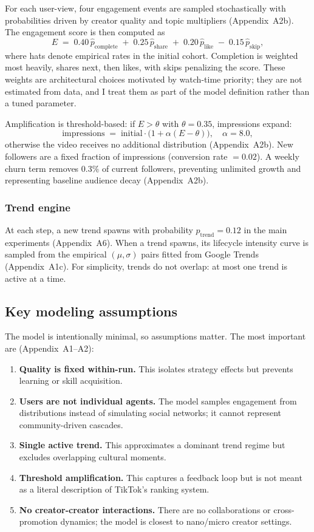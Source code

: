 \documentclass[10pt]{article}
\newcommand{\appref}[1]{(Appendix~#1)}
\begin{document}
For each user-view, four engagement events are sampled stochastically with probabilities driven by creator quality and topic multipliers \appref{A2b}. The engagement score is then computed as
\[
E \;=\; 0.40\,\widehat{p}_{\text{complete}} \;+\; 0.25\,\widehat{p}_{\text{share}} \;+\; 0.20\,\widehat{p}_{\text{like}} \;-\; 0.15\,\widehat{p}_{\text{skip}},
\]
where hats denote empirical rates in the initial cohort. Completion is weighted most heavily, shares next, then likes, with skips penalizing the score. These weights are architectural choices motivated by watch-time priority; they are not estimated from data, and I treat them as part of the model definition rather than a tuned parameter.

Amplification is threshold-based: if \(E>\theta\) with \(\theta=0.35\), impressions expand:
\[
\text{impressions} \;=\; \text{initial} \cdot \bigl(1+\alpha(E-\theta)\bigr),\quad \alpha=8.0,
\]
otherwise the video receives no additional distribution \appref{A2b}. New followers are a fixed fraction of impressions (conversion rate \(=0.02\)). A weekly churn term removes \(0.3\%\) of current followers, preventing unlimited growth and representing baseline audience decay \appref{A2b}.

\subsubsection{Trend engine}
At each step, a new trend spawns with probability \(p_{\text{trend}}=0.12\) in the main experiments \appref{A6}. When a trend spawns, its lifecycle intensity curve is sampled from the empirical \((\mu,\sigma)\) pairs fitted from Google Trends \appref{A1c}. For simplicity, trends do not overlap: at most one trend is active at a time.

\subsection{Key modeling assumptions}
The model is intentionally minimal, so assumptions matter. The most important are \appref{A1--A2}:
\begin{enumerate}
  \item \textbf{Quality is fixed within-run.} This isolates strategy effects but prevents learning or skill acquisition.
  \item \textbf{Users are not individual agents.} The model samples engagement from distributions instead of simulating social networks; it cannot represent community-driven cascades.
  \item \textbf{Single active trend.} This approximates a dominant trend regime but excludes overlapping cultural moments.
  \item \textbf{Threshold amplification.} This captures a feedback loop but is not meant as a literal description of TikTok's ranking system.
  \item \textbf{No creator-creator interactions.} There are no collaborations or cross-promotion dynamics; the model is closest to nano/micro creator settings.
\end{enumerate}
\end{document}
